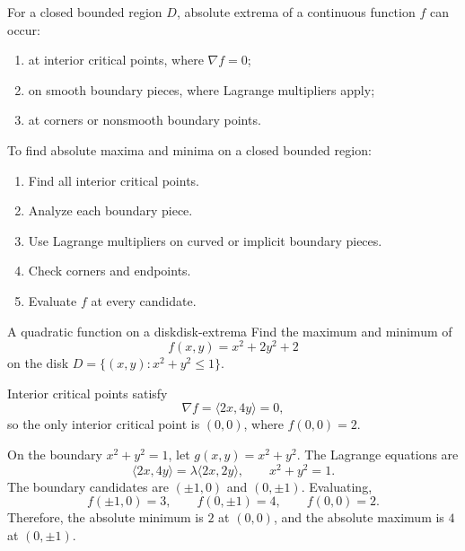 \documentclass[11pt]{article}
\newcommand{\grad}{\nabla}
\begin{document}
For a closed bounded region $D$, absolute extrema of a continuous function $f$ can occur:
\begin{enumerate}
  \item at interior critical points, where $\grad f=0$;
  \item on smooth boundary pieces, where Lagrange multipliers apply;
  \item at corners or nonsmooth boundary points.
\end{enumerate}

\begin{notebox}
To find absolute maxima and minima on a closed bounded region:
\begin{enumerate}
  \item Find all interior critical points.
  \item Analyze each boundary piece.
  \item Use Lagrange multipliers on curved or implicit boundary pieces.
  \item Check corners and endpoints.
  \item Evaluate $f$ at every candidate.
\end{enumerate}
\end{notebox}

\begin{workedexample}{A quadratic function on a disk}{disk-extrema}
Find the maximum and minimum of
\[
f(x,y)=x^2+2y^2+2
\]
on the disk $D=\{(x,y):x^2+y^2\le 1\}$.

Interior critical points satisfy
\[
\grad f=\langle 2x,4y\rangle=0,
\]
so the only interior critical point is $(0,0)$, where $f(0,0)=2$.

On the boundary $x^2+y^2=1$, let $g(x,y)=x^2+y^2$. The Lagrange equations are
\[
\langle 2x,4y\rangle=\lambda\langle 2x,2y\rangle,
\qquad x^2+y^2=1.
\]
The boundary candidates are $(\pm1,0)$ and $(0,\pm1)$. Evaluating,
\[
f(\pm1,0)=3,
\qquad
f(0,\pm1)=4,
\qquad
f(0,0)=2.
\]
Therefore, the absolute minimum is $2$ at $(0,0)$, and the absolute maximum is $4$ at $(0,\pm1)$.
\end{workedexample}
\end{document}
